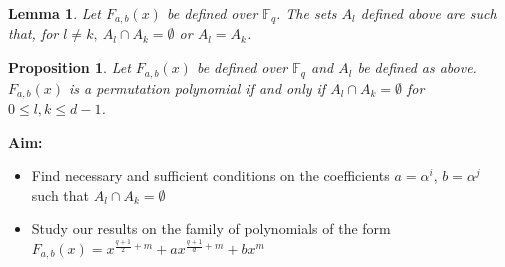 \documentclass[landscape,final,paperwidth=48in,paperheight=38in]{baposter}
\newtheorem{proposition}{Proposition}
\newtheorem{lemma}{Lemma}
\begin{document}
\begin{poster}
{    \begin{lemma}\label{conjuntos_disjuntos}
      Let $F_{a,b}(x)$ be defined over $\mathbb{F}_{q}$. The sets $A_l$ defined  above are such that, for $l \not = k , \ A_l \cap A_k = \emptyset$ or $A_l = A_k$.
    \end{lemma}

    \begin{proposition}
      Let $F_{a,b}(x)$ be defined over $\mathbb{F}_{q}$ and $A_l$ be defined as above. $F_{a,b}(x)$ is a permutation polynomial if and only if $A_l \cap A_k = \emptyset$ for $ 0 \leq l,k \leq d-1$. 
    \end{proposition}
    \textbf{Aim:}
    \begin{itemize}
      \item Find necessary and sufficient conditions on the coefficients $a=\alpha^i$, $b=\alpha^j$ such that $A_l \cap A_k = \emptyset$
      \item Study our results on the family of polynomials of the form $F_{a,b}(x) = x^{\frac{q+1}{2}+m} + a x^{\frac{q+1}{d}+m} + b x^{m}$
    \end{itemize}


   \vspace{0.3em}
  }\label{Future Work}

  \label{References}

\end{poster}
\end{document}
